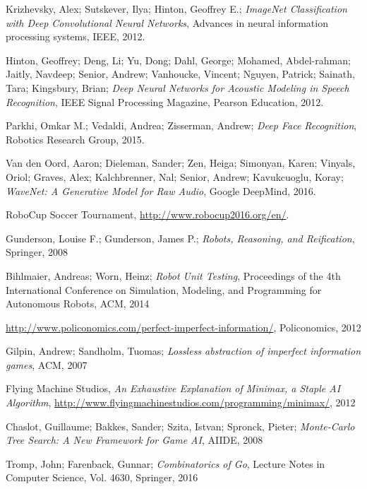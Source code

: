 \documentclass[12pt]{report}
\begin{document}

%
\newpage  
\begin{thebibliography}{99}
 Krizhevsky, Alex; Sutskever, Ilya; Hinton, Geoffrey E.; \emph{ImageNet Classification with Deep Convolutional Neural Networks}, Advances in neural information processing systems, IEEE, 2012.

 Hinton, Geoffrey; Deng, Li; Yu, Dong; Dahl, George; Mohamed, Abdel-rahman; Jaitly, Navdeep; Senior, Andrew; Vanhoucke, Vincent; Nguyen, Patrick; Sainath, Tara; Kingsbury, Brian; \emph{Deep Neural Networks for Acoustic Modeling in Speech Recognition},  IEEE Signal Processing Magazine, Pearson Education, 2012.

 Parkhi, Omkar M.; Vedaldi, Andrea; Zisserman, Andrew; \emph{Deep Face Recognition}, Robotics Research Group, 2015.

 Van den Oord, Aaron; Dieleman, Sander; Zen, Heiga; Simonyan, Karen; Vinyals, Oriol; Graves, Alex; Kalchbrenner, Nal; Senior, Andrew; Kavukcuoglu, Koray; \emph{WaveNet: A Generative Model for Raw Audio}, Google DeepMind, 2016.

 RoboCup Soccer Tournament, \url{http://www.robocup2016.org/en/}.

 Gunderson, Louise F.; Gunderson, James P.; \emph{Robots, Reasoning, and Reification}, Springer, 2008

 Bihlmaier, Andreas; Worn, Heinz; \emph{Robot Unit Testing}, Proceedings of the 4th International Conference on Simulation, Modeling, and Programming for Autonomous Robots, ACM, 2014

 \url{http://www.policonomics.com/perfect-imperfect-information/}, Policonomics, 2012

 Gilpin, Andrew; Sandholm, Tuomas; \emph{Lossless abstraction of imperfect information games}, ACM, 2007

 Flying Machine Studios, \emph{An Exhaustive Explanation of Minimax, a Staple AI Algorithm}, \url{http://www.flyingmachinestudios.com/programming/minimax/}, 2012

 Chaslot, Guillaume; Bakkes, Sander; Szita, Istvan; Spronck, Pieter; \emph{Monte-Carlo Tree Search: A New Framework for Game AI}, AIIDE, 2008

 Tromp, John; Farenback, Gunnar; \emph{Combinatorics of Go}, Lecture Notes in Computer Science, Vol. 4630, Springer, 2016


\end{thebibliography}
\end{document}
